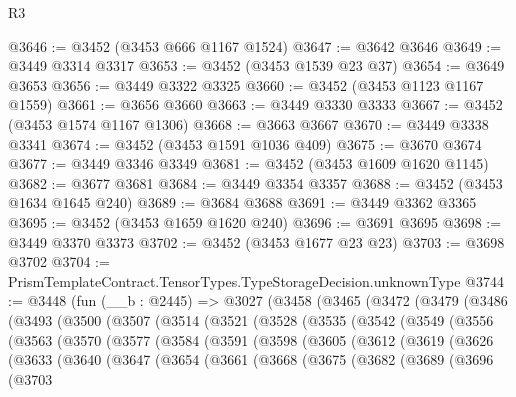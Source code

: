 \begin{lexlean}{R3}
\begin{coremodule}
@3646 := @3452 (@3453 @666 @1167 @1524)
@3647 := @3642 @3646
@3649 := @3449 @3314 @3317
@3653 := @3452 (@3453 @1539 @23 @37)
@3654 := @3649 @3653
@3656 := @3449 @3322 @3325
@3660 := @3452 (@3453 @1123 @1167 @1559)
@3661 := @3656 @3660
@3663 := @3449 @3330 @3333
@3667 := @3452 (@3453 @1574 @1167 @1306)
@3668 := @3663 @3667
@3670 := @3449 @3338 @3341
@3674 := @3452 (@3453 @1591 @1036 @409)
@3675 := @3670 @3674
@3677 := @3449 @3346 @3349
@3681 := @3452 (@3453 @1609 @1620 @1145)
@3682 := @3677 @3681
@3684 := @3449 @3354 @3357
@3688 := @3452 (@3453 @1634 @1645 @240)
@3689 := @3684 @3688
@3691 := @3449 @3362 @3365
@3695 := @3452 (@3453 @1659 @1620 @240)
@3696 := @3691 @3695
@3698 := @3449 @3370 @3373
@3702 := @3452 (@3453 @1677 @23 @23)
@3703 := @3698 @3702
@3704 := PrismTemplateContract.TensorTypes.TypeStorageDecision.unknownType
@3744 := @3448
    (fun (__b : @2445) =>
    @3027
      (@3458
        (@3465
          (@3472
            (@3479
              (@3486
                (@3493
                  (@3500
                    (@3507
                      (@3514
                        (@3521
                          (@3528
                            (@3535
                              (@3542
                                (@3549
                                  (@3556
                                    (@3563
                                      (@3570
                                        (@3577
                                          (@3584
                                            (@3591
                                              (@3598
                                                (@3605
                                                  (@3612
                                                    (@3619
                                                      (@3626
                                                        (@3633
                                                          (@3640
                                                            (@3647
                                                              (@3654
                                                                (@3661
                                                                  (@3668
                                                                    (@3675
                                                                      (@3682
                                                                        (@3689
                                                                          (@3696
                                                                            (@3703

\end{coremodule}
\end{lexlean}

